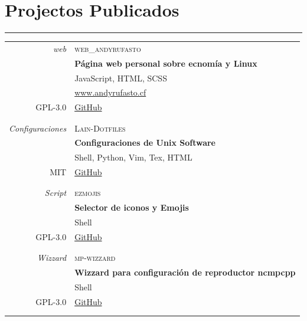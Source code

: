 \documentclass[a4paper,10pt]{article}
\newcommand{\tvspace}{\footnotesize{}\\\multicolumn{2}{c}{}}
\begin{document}
\newpage

\section{Projectos Publicados}
\hrule
\begin{tabular}{r|p{11cm}}
  \emph{web}                     & \textsc{web\_andyrufasto}\\
	                               & \textbf{Página web personal sobre ecnomía y Linux} \\
															   & JavaScript, HTML, SCSS\\
	                               & \href{https://www.andyrufasto.cf}{www.andyrufasto.cf}\\
	\textsc{GPL-3.0}               & \href{https://www.github.com/andyrufasto/web_andyrufasto}{GitHub}\\
				                         & \tvspace \\

  \emph{Configuraciones}         & \textsc{Lain-Dotfiles}\\
	                               & \textbf{Configuraciones de Unix Software} \\
																 & Shell, Python, Vim, Tex, HTML\\
	\textsc{MIT}                   & \href{https://www.github.com/andyrufasto/Lain-Dotfiles}{GitHub}\\
				                         & \tvspace \\

  \emph{Script}                  & \textsc{ezmojis}\\
	                               & \textbf{Selector de iconos y Emojis} \\
															   & Shell \\
	\textsc{GPL-3.0}               & \href{https://www.github.com/andyrufasto/ezmojis}{GitHub}\\
				                         & \tvspace \\
	
  \emph{Wizzard}                 & \textsc{mp-wizzard}\\
	                               & \textbf{Wizzard para configuración de reproductor ncmpcpp} \\
															   & Shell \\
	\textsc{GPL-3.0}               & \href{https://www.github.com/andyrufasto/mp-wizzard}{GitHub}\\
				                         & \tvspace \\
\end{tabular}
\end{document}
